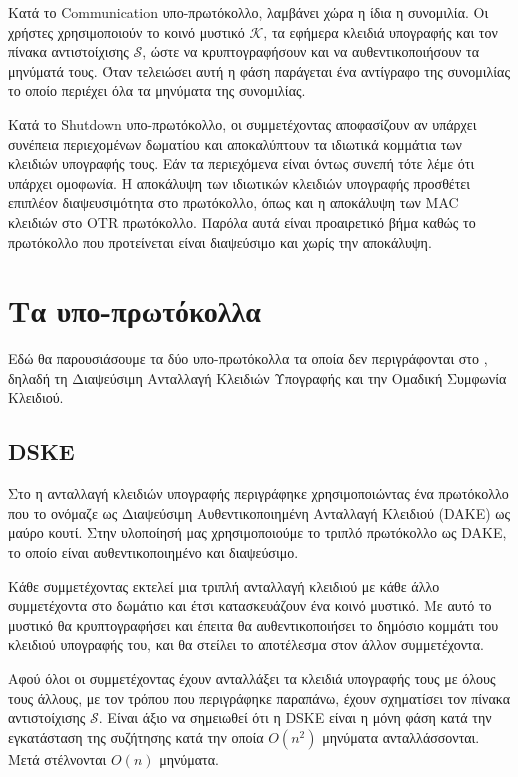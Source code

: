 Κατά το Communication υπο-πρωτόκολλο, λαμβάνει χώρα η ίδια η συνομιλία.
Οι χρήστες χρησιμοποιούν το κοινό μυστικό $\mathcal{K}$, τα εφήμερα κλειδιά υπογραφής και τον πίνακα αντιστοίχισης $\mathcal{S}$, ώστε να κρυπτογραφήσουν και να αυ\-θε\-ντι\-κο\-ποι\-ή\-σουν τα μηνύματά τους.
Όταν τελειώσει αυτή η φάση παράγεται ένα αντίγραφο της συνομιλίας το οποίο περιέχει όλα τα μηνύματα της συνομιλίας.

Κατά το Shutdown υπο-πρωτόκολλο, οι συμμετέχοντας αποφασίζουν αν υπάρχει συνέπεια περιεχομένων δωματίου και αποκαλύπτουν τα ιδιωτικά κομμάτια των κλειδιών υπογραφής τους.
Εάν τα περιεχόμενα είναι όντως συνεπή τότε λέμε ότι υπάρχει ομοφωνία.
Η αποκάλυψη των ιδιωτικών κλειδιών υπογραφής προσθέτει επιπλέον διαψευσιμότητα στο πρωτόκολλο, όπως και η αποκάλυψη των MAC κλειδιών στο OTR πρωτόκολλο.
Παρόλα αυτά είναι προαιρετικό βήμα καθώς το πρωτόκολλο που προτείνεται είναι διαψεύσιμο και χωρίς την αποκάλυψη.

\section{Τα υπο-πρωτόκολλα}
\label{subprots}

Εδώ θα παρουσιάσουμε τα δύο υπο-πρωτόκολλα τα οποία δεν περιγράφονται στο \cite{mpotr}, δηλαδή τη Διαψεύσιμη Ανταλλαγή Κλειδιών Υπογραφής και την Ομαδική Συμφωνία Κλειδιού.

\subsection{DSKE}
\label{dske_subprot}

Στο\cite{mpotr} η ανταλλαγή κλειδιών υπογραφής περιγράφηκε χρησιμοποιώντας ένα πρωτόκολλο που το ονόμαζε ως Διαψεύσιμη Αυθεντικοποιημένη Ανταλλαγή Κλειδιού (DAKE) ως μαύρο κουτί.
Στην υλοποίησή μας χρησιμοποιούμε το τριπλό \dhname πρωτόκολλο ως DAKE, το οποίο είναι αυ\-θε\-ντι\-κο\-ποι\-η\-μέ\-νο και διαψεύσιμο.

Κάθε συμμετέχοντας εκτελεί μια τριπλή \dhname ανταλλαγή κλειδιού με κάθε άλλο συμμετέχοντα στο δωμάτιο και έτσι κατασκευάζουν ένα κοινό μυστικό.
Με αυτό το μυστικό θα κρυπτογραφήσει και έπειτα θα αυθεντικοποιήσει το δημόσιο κομμάτι του κλειδιού υπογραφής του, και θα στείλει το αποτέλεσμα στον άλλον συμμετέχοντα.

Αφού όλοι οι συμμετέχοντας έχουν ανταλλάξει τα κλειδιά υπογραφής τους με όλους τους άλλους, με τον τρόπου που περιγράφηκε παραπάνω, έχουν σχηματίσει τον πί\-να\-κα αντιστοίχισης $\mathcal{S}$.
Είναι άξιο να σημειωθεί ότι η DSKE είναι η μόνη φάση κατά την εγκατάσταση της συζήτησης κατά την οποία $O(n^2)$ μηνύματα ανταλλάσσονται.
Μετά στέλνονται $O(n)$ μηνύματα.

